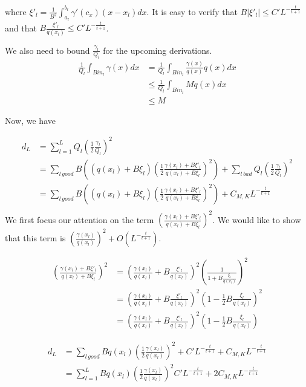 \documentclass{article}
\begin{document}
where $\xi'_l = \frac{1}{B^2} \int_{a_l}^{b_l} \gamma'(c_x)(x - x_l) dx$. It is easy to verify that $B |\xi'_l| \leq C' L^{ - \frac{t}{t+1}}$ and that $ B \frac{\xi'_l}{q(x_l)} \leq C' L^{-\frac{t}{t+1}}$. 


We also need to bound $\frac{\gamma_l}{Q_l}$ for the upcoming derivations. 
\begin{align*}
\frac{1}{Q_l} \int_{Bin_l} \gamma(x) dx &= \frac{1}{Q_l} \int_{Bin_l} \frac{\gamma(x)}{q(x)} q(x) dx \\
  &\leq \frac{1}{Q_l} \int_{Bin_l} M q(x) dx \\
  &\leq M
\end{align*}

Now, we have

\begin{align*}
d_L &= \sum_{l=1}^L Q_l \left( \frac{1}{2} \frac{\gamma_l}{Q_l} \right)^2 \\
  &= \sum_{l \, good}  B \left(
     (q(x_l) + B \xi_l) \left( \frac{1}{2} \frac{\gamma(x_l) + B \xi'_l}{q(x_l) + B \xi_l} \right)^2 \right) + \sum_{l \, bad} Q_l \left( \frac{1}{2} \frac{\gamma_l}{Q_l} \right)^2 \\
   &=   \sum_{l \, good}  B \left(
     (q(x_l) + B \xi_l) \left( \frac{1}{2} \frac{\gamma(x_l) + B \xi'_l}{q(x_l) + B \xi_l} \right)^2 \right) + C_{M,K} L^{-\frac{t}{t+1}}  \\
\end{align*}
We first focus our attention on the term $\left( \frac{\gamma(x_l) + B \xi'_l}{q(x_l) + B\xi_l} \right)^2$. We would like to show that this term is $\left( \frac{\gamma(x_l)}{q(x_l)} \right)^2 + O(L^{-\frac{t}{t+1}})$. 

\begin{align*}
\left( \frac{\gamma(x_l) + B \xi'_l}{q(x_l) + B\xi_l} \right)^2 &= 
    \left( \frac{\gamma(x_l)}{q(x_l)} + B \frac{\xi'_l}{q(x_l)}  \right)^2 \left(\frac{1}{1 + B \frac{\xi_l}{q(x_l)}} \right)^2 \\
  &=  \left( \frac{\gamma(x_l)}{q(x_l)} + B \frac{\xi'_l}{q(x_l)}  \right)^2 \left(1 - \frac{1}{2} B \frac{\xi_l}{q(x_l)} \right)^2 \\
  &= \left( \frac{\gamma(x_l)}{q(x_l)} + B \frac{\xi'_l}{q(x_l)}  \right)^2 \left(1 - \frac{1}{2} B \frac{\xi_l}{q(x_l)} \right) 
\end{align*}




\begin{align*}
  d_L &= \sum_{l \, good} B q(x_l) \left( \frac{1}{2} \frac{\gamma(x_l)}{q(x_l)} \right)^2 + C' L^{-\frac{t}{t+1}}  + C_{M,K} L^{-\frac{t}{t+1}} \\
  &= \sum_{l=1}^L B q(x_l) \left( \frac{1}{2} \frac{\gamma(x_l)}{q(x_l)} \right)^2  C' L^{-\frac{t}{t+1}}  + 2 C_{M,K} L^{-\frac{t}{t+1}} \\
\end{align*}
\end{document}
